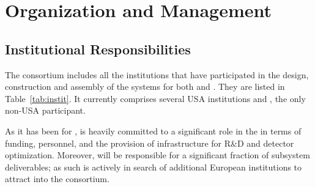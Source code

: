 \section{Organization and Management}
\label{sec:fdsp-hv-org}


\subsection{Institutional Responsibilities}
\label{sec:fdsp-hv-org-consortium}
The  consortium %
includes all the institutions that have participated in the design, construction and assembly of the  systems for both   and . They are listed in 
Table~\ref{tab:instit}. 
%
It currently comprises several USA institutions and , %
the only non-USA participant.  
 
  
 As it has been %
for ,  is heavily committed to a significant role in the   in terms of funding, personnel, 
 and the provision of infrastructure for R\&D and detector optimization. Moreover,  will be responsible for a significant fraction of subsystem deliverables; as such   is actively in search of additional European institutions to attract into the consortium. 
 
